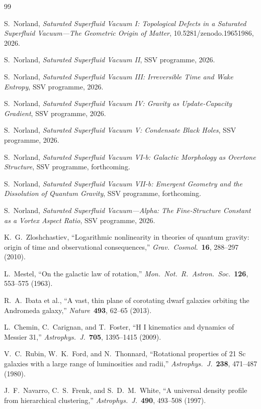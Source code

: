 \documentclass[11pt,a4paper]{article}
\begin{document}
\begin{thebibliography}{99}

S.\ Norland, \textit{Saturated Superfluid Vacuum I: Topological Defects in a Saturated
Superfluid Vacuum---The Geometric Origin of Matter},
10.5281/zenodo.19651986, 2026.

S.\ Norland, \textit{Saturated Superfluid Vacuum II}, SSV programme, 2026.

S.\ Norland, \textit{Saturated Superfluid Vacuum III: Irreversible Time and Wake Entropy},
SSV programme, 2026.

S.\ Norland, \textit{Saturated Superfluid Vacuum IV: Gravity as Update-Capacity Gradient},
SSV programme, 2026.

S.\ Norland, \textit{Saturated Superfluid Vacuum V: Condensate Black Holes},
SSV programme, 2026.

S.\ Norland, \textit{Saturated Superfluid Vacuum VI-b: Galactic Morphology as Overtone
Structure}, SSV programme, forthcoming.

S.\ Norland, \textit{Saturated Superfluid Vacuum VII-b: Emergent Geometry and the
Dissolution of Quantum Gravity}, SSV programme, forthcoming.

S.\ Norland, \textit{Saturated Superfluid Vacuum---Alpha: The Fine-Structure
Constant as a Vortex Aspect Ratio}, SSV programme, 2026.

K.~G.\ Zloshchastiev, ``Logarithmic nonlinearity in theories of quantum gravity:
origin of time and observational consequences,''
\textit{Grav.\ Cosmol.}\ \textbf{16}, 288--297 (2010).

L.\ Mestel, ``On the galactic law of rotation,''
\textit{Mon.\ Not.\ R.\ Astron.\ Soc.}\ \textbf{126}, 553--575 (1963).

R.~A.\ Ibata et al., ``A vast, thin plane of corotating dwarf galaxies orbiting the
Andromeda galaxy,'' \textit{Nature}\ \textbf{493}, 62--65 (2013).

L.\ Chemin, C.\ Carignan, and T.\ Foster,
``H I kinematics and dynamics of Messier 31,''
\textit{Astrophys.\ J.}\ \textbf{705}, 1395--1415 (2009).

V.~C.\ Rubin, W.~K.\ Ford, and N.\ Thonnard,
``Rotational properties of 21 Sc galaxies with a large range of luminosities and radii,''
\textit{Astrophys.\ J.}\ \textbf{238}, 471--487 (1980).

J.~F.\ Navarro, C.~S.\ Frenk, and S.~D.~M.\ White,
``A universal density profile from hierarchical clustering,''
\textit{Astrophys.\ J.}\ \textbf{490}, 493--508 (1997).

\end{thebibliography}
\end{document}
